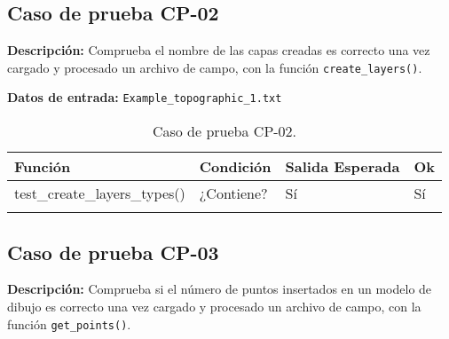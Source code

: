\subsection{Caso de prueba CP-02}

\textbf{Descripción:} Comprueba el nombre de las capas creadas es correcto una vez cargado y procesado un archivo de campo, con la función \texttt{create\_layers()}.

\textbf{Datos de entrada:} \texttt{Example\_topographic\_1.txt}


\begin{longtable}[]{@{}llll@{}}
\toprule
\begin{minipage}[b]{0.6\columnwidth}\raggedright\strut
Función\strut
\end{minipage} & \begin{minipage}[b]{0.20\columnwidth}\raggedright\strut
Condición\strut
\end{minipage} & \begin{minipage}[b]{0.15\columnwidth}\raggedright\strut
Salida Esperada\strut
\end{minipage} & \begin{minipage}[b]{0.05\columnwidth}\raggedright\strut
Ok\strut
\end{minipage}\tabularnewline
\midrule
\endhead
\begin{minipage}[t]{0.6\columnwidth}\raggedright\strut
\small{test\_create\_layers\_types()}\strut
\end{minipage} & \begin{minipage}[t]{0.20\columnwidth}\raggedright\strut
¿Contiene?\strut
\end{minipage} & \begin{minipage}[t]{0.15\columnwidth}\raggedright\strut
Sí\strut
\end{minipage} & \begin{minipage}[t]{0.05\columnwidth}\raggedright\strut
Sí\strut
\end{minipage}\tabularnewline
\bottomrule
\caption{Caso de prueba CP-02.}
\end{longtable}

\subsection{Caso de prueba CP-03}

\textbf{Descripción:} Comprueba si el número de puntos insertados en un modelo de dibujo es correcto una vez cargado y procesado un archivo de campo, con la función \texttt{get\_points()}.

